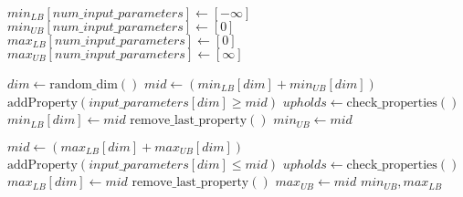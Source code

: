 \begin{algorithmic}[1]
    \State $min_{LB}[num\_input\_parameters] \gets [- \infty]$
    \State $min_{UB}[num\_input\_parameters] \gets [ 0]$
    \State $max_{LB}[num\_input\_parameters] \gets [0]$
    \State $max_{UB}[num\_input\_parameters] \gets [ \infty]$
    \item[]
        \State $dim \gets \text{random\_dim}()$
        \State $mid \gets (min_{LB}[dim] + min_{UB}[dim])$ 
        \State $\text{addProperty}(input\_parameters[dim] \geq mid)$
        \State $upholds \gets \text{check\_properties}()$
            \State $min_{LB}[dim] \gets mid$
        \Else
            \State $\text{remove\_last\_property}()$
            \State $min_{UB} \gets mid$
        \EndIf
        \item[]
        \State $mid \gets (max_{LB}[dim] + max_{UB}[dim])$ 
        \State $\text{addProperty}(input\_parameters[dim] \leq mid)$
        \State $upholds \gets \text{check\_properties}()$
            \State $max_{LB}[dim] \gets mid$
        \Else
            \State $\text{remove\_last\_property}()$
            \State $max_{UB} \gets mid$
        \EndIf
    \EndWhile
    \State \Return $min_{UB}, max_{LB}$
\end{algorithmic}